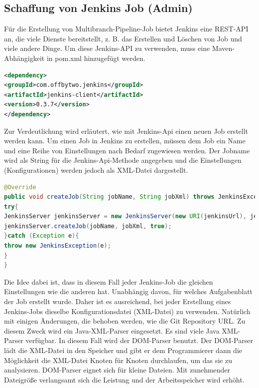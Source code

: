 \documentclass[a4paper,12pt,oneside]{book}
\begin{document}
\subsection{Schaffung von Jenkins Job (Admin)}
Für die Erstellung von Multibranch-Pipeline-Job bietet Jenkins eine REST-API an, die viele Dienste bereitstellt, z. B. das Erstellen und Löschen von Job und viele andere Dinge. Um diese Jenkins-API zu verwenden, muss eine Maven-Abhängigkeit in pom.xml hinzugefügt werden.
\begin{lstlisting}[language=XML,caption=pom.xml - Jenkins-Api]
<dependency>
<groupId>com.offbytwo.jenkins</groupId>
<artifactId>jenkins-client</artifactId>
<version>0.3.7</version>
</dependency>
\end{lstlisting}
Zur Verdeutlichung wird erläutert, wie mit Jenkins-Api einen neuen Job erstellt werden kann. Um einen Job in Jenkins zu erstellen, müssen dem Job  ein Name und eine Reihe von Einstellungen nach Bedarf  zugewiesen werden.
\newline
Der Jobname wird als String  für die Jenkins-Api-Methode angegeben und die Einstellungen (Konfigurationen) werden jedoch als XML-Datei dargestellt.
\begin{lstlisting}[language=JAVA,caption=JenkinsServiceImp - createJob]
@Override
public void createJob(String jobName, String jobXml) throws JenkinsException {
try{
JenkinsServer jenkinsServer = new JenkinsServer(new URI(jenkinsUrl), jenkinsUser, jenkinsPassword);
jenkinsServer.createJob(jobName, jobXml, true);
}catch (Exception e){
throw new JenkinsException(e);
} 
}
\end{lstlisting}
Die Idee dabei ist, dass in diesem Fall jeder Jenkins-Job die gleichen Einstellungen wie die anderen hat. Unabhängig davon, für welches Aufgabenblatt der Job erstellt wurde. Daher ist es ausreichend, bei jeder Erstellung eines Jenkins-Jobs dieselbe Konfigurationsdatei (XML-Datei) zu verwenden. Natürlich mit einigen Änderungen, die behoben werden, wie die Git Repository URL. Zu diesem Zweck wird ein Java-XML-Parser eingesetzt. Es sind viele Java XML-Parser verfügbar. In diesem Fall wird der DOM-Parser benutzt. Der DOM-Parser lädt die XML-Datei in den Speicher und gibt er dem Programmierer dann die Möglichkeit die XML-Datei Knoten für Knoten durchlaufen, um das sie zu analysieren. DOM-Parser eignet sich für kleine Dateien. Mit zunehmender Dateigröße verlangsamt sich die Leistung und der Arbeitsspeicher wird erhöht.
\end{document}
